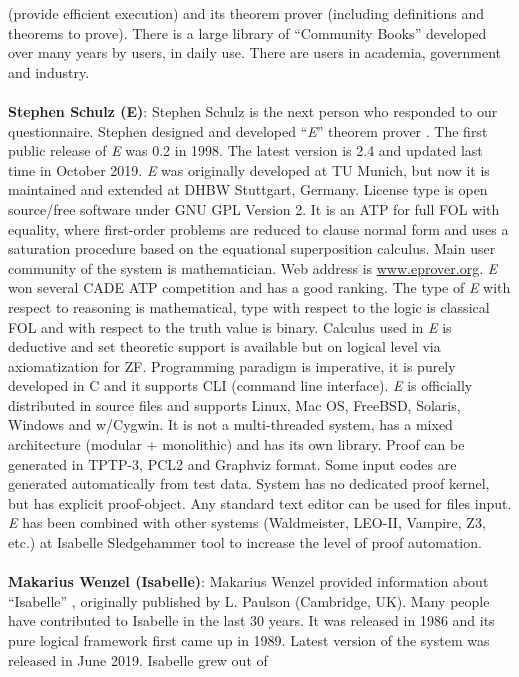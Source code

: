 (provide efficient execution) and its theorem prover (including definitions and theorems to prove). 
There is a large library of ``Community Books'' developed over many years by users, in daily use. There are users in academia,
government and industry.  
\\\\
{\bf Stephen Schulz (E)}: Stephen Schulz is the next person who responded to our questionnaire. Stephen designed and developed ``{\em E}'' theorem prover . The first 
public release of \emph{E} was 0.2 in 1998. The latest version is 2.4 and updated last time in October 2019. \emph{E} was originally developed at 
TU Munich, but now it is maintained and extended at DHBW Stuttgart, Germany. License type is open source/free software under GNU GPL Version 2. 
It is an ATP for full FOL with equality, where first-order problems are reduced to clause normal form and uses a saturation procedure based on 
the equational superposition calculus. Main user community of the system is mathematician.
Web address is \url{www.eprover.org}.
\emph{E} won  several CADE ATP competition and has a good ranking. The type of \emph{E} with 
respect to reasoning is mathematical, type with respect to the logic is classical FOL and with respect to the truth value is binary.
Calculus used in \emph{E} is deductive and set theoretic support is available but on logical level via axiomatization for ZF. 
Programming paradigm is imperative, it is purely developed in C and it supports CLI (command line interface). \emph{E} is officially
distributed in source files and supports Linux, Mac OS, FreeBSD, Solaris, Windows and w/Cygwin. It is not a multi-threaded system, has a mixed
architecture (modular + monolithic) and has its own library. Proof can be generated in TPTP-3, PCL2 and Graphviz format. 
Some input codes are generated automatically from test data. System has no dedicated proof kernel, but has explicit proof-object. 
Any standard text editor can be used for files input. \emph{E} has been combined with other systems (Waldmeister, LEO-II, Vampire, Z3, etc.) at 
Isabelle Sledgehammer tool  to increase the level of proof automation. 
\\\\
{\bf Makarius Wenzel (Isabelle)}: Makarius Wenzel provided information about ``Isabelle'' , originally published by L. Paulson (Cambridge, UK). 
Many people have contributed to Isabelle in the last 30 years. It was released in 1986 and its pure logical framework first 
came up in 1989. Latest version of the system was released in June 2019. Isabelle grew out of 
